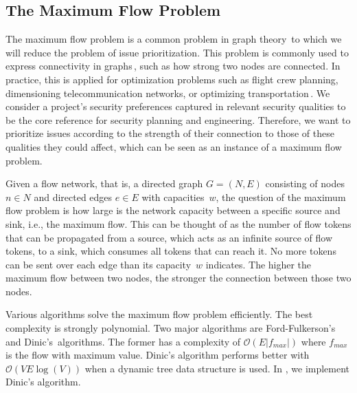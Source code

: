 \subsection{The Maximum Flow Problem}
\noindent
The maximum flow problem is a common problem in graph theory\,\cite{harris1955} to which we will reduce the problem of issue prioritization.%
This problem is commonly used to express connectivity in graphs\,\cite{Esfahanian2013}, such as how strong two nodes are connected.
In practice, this is applied for optimization problems such as flight crew planning, dimensioning telecommunication networks, or optimizing transportation\,\cite{Feng2012}.
We consider a project's security preferences captured in relevant security qualities to be the core reference for security planning and engineering.
Therefore, we want to prioritize issues according to the strength of their connection to those of these qualities they could affect, which can be seen as an instance of a maximum flow problem.

Given a flow network, that is, a directed graph $G = (N,E)$ consisting of nodes $n \in N$ and directed edges $e \in E$ with capacities~$w$, the question of the maximum flow problem is how large is the network capacity between a specific source and sink, i.e., the maximum flow.
This can be thought of as the number of flow tokens that can be propagated from a source, which acts as an infinite source of flow tokens, to a sink, which consumes all tokens that can reach it.
No more tokens can be sent over each edge than its capacity~$w$ indicates.
The higher the maximum flow between two nodes, the stronger the connection between those two nodes.

Various algorithms solve the maximum flow problem efficiently.
The best complexity is strongly polynomial.
Two major algorithms %
are Ford-Fulkerson's\,\cite{ford_fulkerson_1956} and Dinic's\,\cite{dinic1970algorithm} algorithms.
The former has a complexity of $\mathcal{O}(E|f_{max}|)$ where $f_{max}$ is the flow with maximum value.
Dinic's algorithm performs better with $\mathcal{O}(VE\log(V))$ when a dynamic tree data structure is used.
In \appr{}, we implement Dinic’s algorithm.